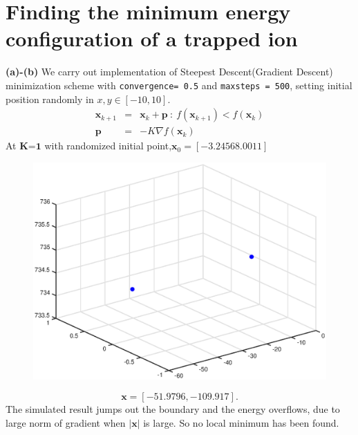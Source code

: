 \documentclass{article}
\begin{document}
\section{Finding the minimum energy configuration of a trapped ion}
\textbf{(a)-(b)} We carry out implementation of Steepest Descent(Gradient Descent) minimization scheme with \texttt{convergence= 0.5} and \texttt{maxsteps = 500}, setting initial position randomly in $x,y\in[-10,10]$.
\begin{eqnarray*}
\mathbf{x}_{k+1}&=&\mathbf{x}_{k}+\mathbf{p}~:~ f(\mathbf{x}_{k+1})<f(\mathbf{x}_{k})\\
\mathbf{p}&=&-K\nabla f(\mathbf{x}_{k})
\end{eqnarray*}
At $\textbf{K=1}$ with randomized initial point,$\mathbf{x}_0 = [-3.2456 8.0011]$ 
\begin{figure}[h]
    \centering
    \includegraphics[scale=0.46]{11}
\end{figure}
$$\mathbf{x} = [-51.9796 , -109.917].$$
The simulated result jumps out the boundary and the energy overflows, due to large norm of gradient when $|{\mathbf{x}}|$ is large. So no local minimum has been found.
\end{document}
